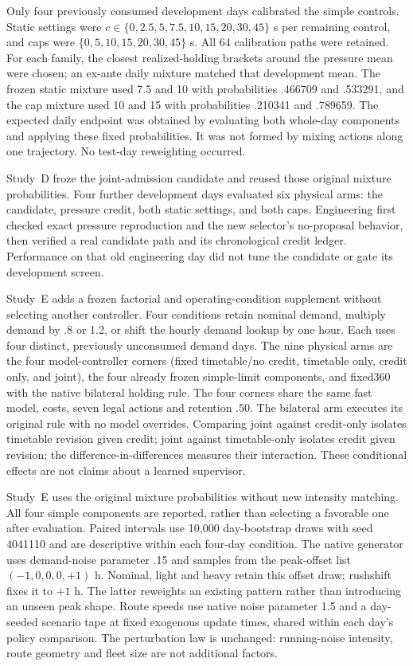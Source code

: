 Only four previously consumed development days calibrated the simple controls. Static settings were $c\in\{0,2.5,5,7.5,10,15,20,30,45\}$ s per remaining control, and caps were $\{0,5,10,15,20,30,45\}$ s. All 64 calibration paths were retained. For each family, the closest realized-holding brackets around the pressure mean were chosen; an ex-ante daily mixture matched that development mean. The frozen static mixture used 7.5 and 10 with probabilities .466709 and .533291, and the cap mixture used 10 and 15 with probabilities .210341 and .789659. The expected daily endpoint was obtained by evaluating both whole-day components and applying these fixed probabilities. It was not formed by mixing actions along one trajectory. No test-day reweighting occurred.

Study~D froze the joint-admission candidate and reused those original mixture probabilities. Four further development days evaluated six physical arms: the candidate, pressure credit, both static settings, and both caps. Engineering first checked exact pressure reproduction and the new selector's no-proposal behavior, then verified a real candidate path and its chronological credit ledger. Performance on that old engineering day did not tune the candidate or gate its development screen.

Study~E adds a frozen factorial and operating-condition supplement without selecting another controller. Four conditions retain nominal demand, multiply demand by .8 or 1.2, or shift the hourly demand lookup by one hour. Each uses four distinct, previously unconsumed demand days. The nine physical arms are the four model-controller corners (fixed timetable/no credit, timetable only, credit only, and joint), the four already frozen simple-limit components, and fixed360 with the native bilateral holding rule. The four corners share the same fast model, costs, seven legal actions and retention .50. The bilateral arm executes its original rule with no model overrides. Comparing joint against credit-only isolates timetable revision given credit; joint against timetable-only isolates credit given revision; the difference-in-differences measures their interaction. These conditional effects are not claims about a learned supervisor.

Study~E uses the original mixture probabilities without new intensity matching.
All four simple components are reported, rather than selecting a favorable one
after evaluation. Paired intervals use 10,000 day-bootstrap draws with seed
4041110 and are descriptive within each four-day condition. The native
generator uses demand-noise parameter .15 and samples from the peak-offset list
$(-1,0,0,0,+1)$ h. Nominal, light and heavy retain this offset draw; rushshift
fixes it to $+1$ h. The latter reweights an existing pattern rather than
introducing an unseen peak shape. Route speeds use native noise parameter 1.5
and a day-seeded scenario tape at fixed exogenous update times, shared within
each day's policy comparison. The perturbation law is unchanged: running-noise
intensity, route geometry and fleet size are not additional factors.

